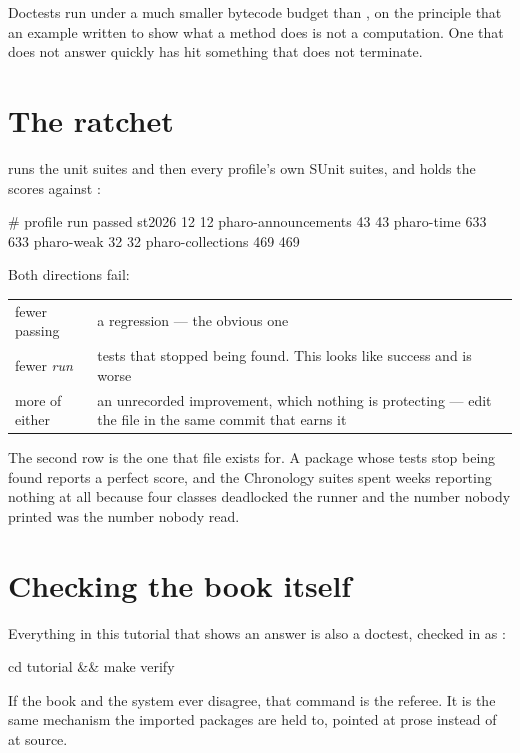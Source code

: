 Doctests run under a much smaller bytecode budget than , on the
principle that an example written to show what a method does is not a
computation. One that does not answer quickly has hit something that does not
terminate.

\section{The ratchet}

 runs the unit suites and then every profile's own SUnit suites,
and holds the scores against :

\begin{plain}
# profile               run  passed
st2026                  12   12
pharo-announcements     43   43
pharo-time              633  633
pharo-weak              32   32
pharo-collections       469  469
\end{plain}

Both directions fail:

\begin{center}
\small
\begin{tabular}{@{}lp{}@{}}
\toprule
fewer passing & a regression --- the obvious one\\
fewer \emph{run} & tests that stopped being found. This looks like success and
  is worse\\
more of either & an unrecorded improvement, which nothing is protecting ---
  edit the file in the same commit that earns it\\
\bottomrule
\end{tabular}
\end{center}

The second row is the one that file exists for. A package whose tests stop
being found reports a perfect score, and the Chronology suites spent weeks
reporting nothing at all because four classes deadlocked the runner and the
number nobody printed was the number nobody read.

\section{Checking the book itself}

Everything in this tutorial that shows an answer is also a doctest, checked in
as :

\begin{sh}
cd tutorial && make verify
\end{sh}

If the book and the system ever disagree, that command is the referee. It is
the same mechanism the imported packages are held to, pointed at prose instead
of at source.

